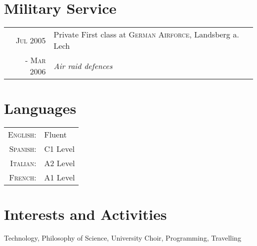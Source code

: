 \documentclass[a4paper,10pt]{article}
\begin{document}
\section{Military Service}
\begin{tabular}{r|p{11cm}}
 \textsc{Jul 2005}& Private First class at \textsc{German Airforce}, Landsberg a. Lech \\\textsc{- Mar 2006}&\emph{Air raid defences}\\
\end{tabular}

\section{Languages}
\begin{tabular}{rl}
\textsc{English:}&Fluent\\
\textsc{Spanish:}& C1 Level\\
\textsc{Italian:}&  A2 Level\\
\textsc{French:}& A1 Level\\
\end{tabular}

\section{Interests and Activities}
Technology, Philosophy of Science, University Choir, Programming, Travelling\\


\end{document}
